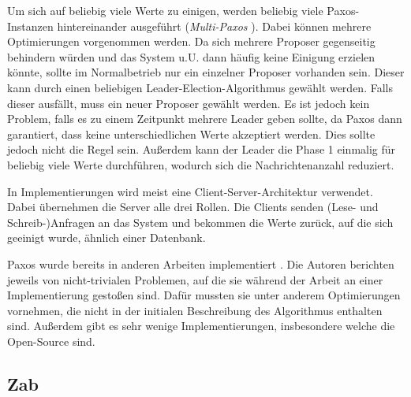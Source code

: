 Um sich auf beliebig viele Werte zu einigen, werden beliebig viele Paxos-Instanzen hintereinander ausgeführt (\textit{Multi-Paxos} \cite{paxos-made-live}). Dabei können mehrere Optimierungen vorgenommen werden. Da sich mehrere Proposer gegenseitig behindern würden und das System u.U. dann häufig keine Einigung erzielen könnte, sollte im Normalbetrieb nur ein einzelner Proposer vorhanden sein. Dieser kann durch einen beliebigen Leader-Election-Algorithmus gewählt werden. Falls dieser ausfällt, muss ein neuer Proposer gewählt werden. Es ist jedoch kein Problem, falls es zu einem Zeitpunkt mehrere Leader geben sollte, da Paxos dann garantiert, dass keine unterschiedlichen Werte akzeptiert werden. Dies sollte jedoch nicht die Regel sein. Außerdem kann der Leader die Phase 1 einmalig für beliebig viele Werte durchführen, wodurch sich die Nachrichtenanzahl reduziert.

In Implementierungen wird meist eine Client-Server-Architektur verwendet. Dabei übernehmen die Server alle drei Rollen. Die Clients senden (Lese- und Schreib-)Anfragen an das System und bekommen die Werte zurück, auf die sich geeinigt wurde, ähnlich einer Datenbank.

Paxos wurde bereits in anderen Arbeiten implementiert \cite{paxos-made-complex, paxos-made-live}. Die Autoren berichten jeweils von nicht-trivialen Problemen, auf die sie während der Arbeit an einer Implementierung gestoßen sind. Dafür mussten sie unter anderem Optimierungen vornehmen, die nicht in der initialen Beschreibung des Algorithmus enthalten sind. Außerdem gibt es sehr wenige Implementierungen, insbesondere welche die Open-Source sind.

\subsection{Zab}
\label{zab}

